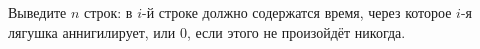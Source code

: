 Выведите $n$ строк: в $i$-й строке должно содержатся время, через которое $i$-я лягушка аннигилирует, или $0$, если этого не произойдёт никогда.